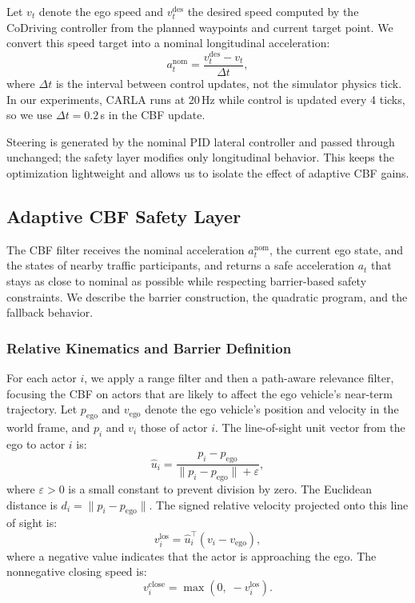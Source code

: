 Let $v_t$ denote the ego speed and $v_t^{\text{des}}$ the desired speed computed by the CoDriving controller from the planned waypoints and current target point. We convert this speed target into a nominal longitudinal acceleration:
\begin{equation}
a_t^{\text{nom}} = \frac{v_t^{\text{des}} - v_t}{\Delta t},
\end{equation}
where $\Delta t$ is the interval between control updates, not the simulator physics tick. In our experiments, CARLA runs at 20\,Hz while control is updated every 4 ticks, so we use $\Delta t=0.2$\,s in the CBF update.

Steering is generated by the nominal PID lateral controller and passed through unchanged; the safety layer modifies only longitudinal behavior. This keeps the optimization lightweight and allows us to isolate the effect of adaptive CBF gains.

\subsection{Adaptive CBF Safety Layer}

The CBF filter receives the nominal acceleration $a_t^{\text{nom}}$, the current ego state, and the states of nearby traffic participants, and returns a safe acceleration $a_t$ that stays as close to nominal as possible while respecting barrier-based safety constraints. We describe the barrier construction, the quadratic program, and the fallback behavior.

\subsubsection{Relative Kinematics and Barrier Definition}

For each actor $i$, we apply a range filter and then a path-aware relevance filter, focusing the CBF on actors that are likely to affect the ego vehicle's near-term trajectory. Let $p_{\text{ego}}$ and $v_{\text{ego}}$ denote the ego vehicle's position and velocity in the world frame, and $p_i$ and $v_i$ those of actor $i$. The line-of-sight unit vector from the ego to actor $i$ is:
\begin{equation}
\hat{u}_i = \frac{p_i - p_{\text{ego}}}{\|p_i - p_{\text{ego}}\| + \varepsilon},
\end{equation}
where $\varepsilon > 0$ is a small constant to prevent division by zero.
The Euclidean distance is $d_i = \|p_i - p_{\text{ego}}\|$. The signed relative velocity projected onto this line of sight is:
\begin{equation}
v_i^{\text{los}} = \hat{u}_i^\top (v_i - v_{\text{ego}}),
\end{equation}
where a negative value indicates that the actor is approaching the ego. The nonnegative closing speed is:
\begin{equation}
v_i^{\text{close}} = \max\!\left(0,\; -v_i^{\text{los}}\right).
\end{equation}

